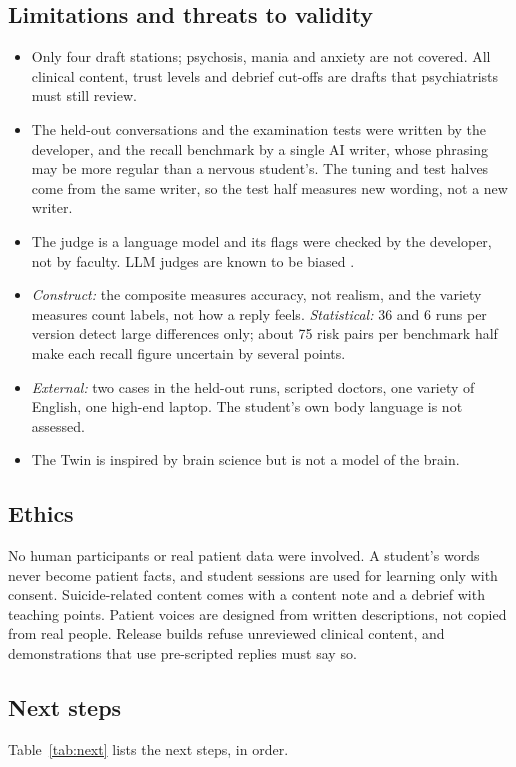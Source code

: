 \subsection{Limitations and threats to validity}
\begin{itemize}
\item Only four draft stations; psychosis, mania and anxiety are not covered. All clinical content, trust levels and debrief cut-offs are drafts
that psychiatrists must still review.
\item The held-out conversations and the examination tests were written by the developer, and the recall benchmark by a single AI writer, whose
phrasing may be more regular than a nervous student's. The tuning and test halves come from the same writer, so the test half measures new
wording, not a new writer.
\item The judge is a language model and its flags were checked by the developer, not by faculty. LLM judges are known to be biased
\cite{zheng2023judging}.
\item \emph{Construct:} the composite measures accuracy, not realism, and the variety measures count labels, not how a reply feels.
\emph{Statistical:} 36 and 6 runs per version detect large differences only; about 75 risk pairs per benchmark half make each recall figure
uncertain by several points.
\item \emph{External:} two cases in the held-out runs, scripted doctors, one variety of English, one high-end laptop. The student's own body
language is not assessed.
\item The Twin is inspired by brain science but is not a model of the brain.
\end{itemize}

\subsection{Ethics}
No human participants or real patient data were involved. A student's words never become patient facts, and student sessions are used for
learning only with consent. Suicide-related content comes with a content note and a debrief with teaching points. Patient voices are designed
from written descriptions, not copied from real people. Release builds refuse unreviewed clinical content, and demonstrations that use
pre-scripted replies must say so.

\subsection{Next steps}
Table~\ref{tab:next} lists the next steps, in order.


